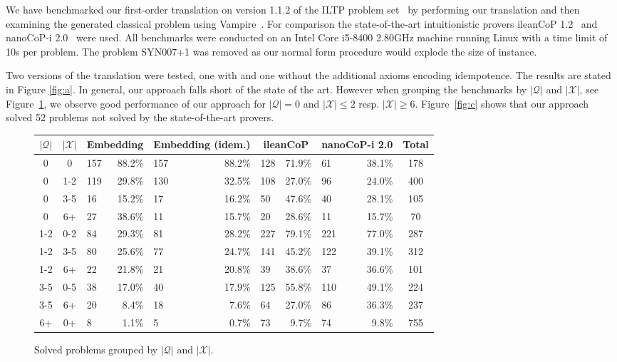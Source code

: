 \documentclass[runningheads]{llncs}
\begin{document}
We have benchmarked our first-order translation on version 1.1.2 of the ILTP problem set~\cite{iltp} by performing our translation and then examining the generated classical problem using Vampire~\cite{kovacs2013first}. 
For comparison the state-of-the-art intuitionistic provers ileanCoP 1.2~\cite{otten2008leancop} and nanoCoP-i 2.0~\cite{otten2021nanocop} were used. All benchmarks were conducted on an Intel Core i5-8400 2.80GHz machine running Linux with a time limit of 10s per problem. The problem \textsc{SYN007+1} was removed as our normal form procedure would explode the size of instance.

Two versions of the translation were tested, one with and one without the additional axioms encoding idempotence. The results are stated in Figure \ref{fig:a}. 
In general, our approach falls short of the state of the art. 
However when grouping the benchmarks by $|\mathcal Q|$ and $|\mathcal X|$, see Figure~\ref{fig:b},
we observe good performance of our approach for $|\mathcal Q| = 0$ and $|\mathcal X| \leq 2$ resp. $|\mathcal X| \geq 6$.
Figure~\ref{fig:c} shows that our approach solved 52 problems not solved by the state-of-the-art provers.\pagebreak
\begin{figure}
	\centering
	\begin{tabular}{c|c|lr|lr|lr|lr|c}
		$|\mathcal Q|$&$|\mathcal X|$&\multicolumn{2}{c}{Embedding}&\multicolumn{2}{c}{Embedding (idem.)}&\multicolumn{2}{c}{ileanCoP}&\multicolumn{2}{c}{nanoCoP-i 2.0}&Total\\\hline
		0&0		&157&88.2\%	&157&88.2\%		&128&71.9\%		&61&38.1\%	&178\\
		0&1-2	&119&29.8\%&130&32.5\%		&108&27.0\%		&96&24.0\%	&400\\
		0&3-5	&16&15.2\%	&17&16.2\%		&50&47.6\%		&40&28.1\%	&105\\
		0&6+	&27&38.6\%	&11&15.7\%		&20&28.6\%		&11&15.7\%	&70\\
		1-2&0-2	&84&29.3\%	&81&28.2\%		&227&79.1\%		&221&77.0\%	&287\\
		1-2&3-5	&80&25.6\%	&77&24.7\%		&141&45.2\%		&122&39.1\%	&312\\
		1-2&6+	&22&21.8\%	&21&20.8\%		&39&38.6\%		&37&36.6\%	&101\\
		3-5&0-5	&38&17.0\%	&40&17.9\%		&125&55.8\%		&110&49.1\%	&224\\
		3-5&6+  &20&8.4\%	&18&7.6\%		&64&27.0\%		&86&36.3\%	&237\\
		6+&0+	&8&1.1\%	&5&0.7\%		&73&9.7\%		&74&9.8\%	&755
	\end{tabular}
	\caption{Solved problems grouped by $|\mathcal Q|$ and $|\mathcal X|$.}
	\label{fig:b}
\end{figure}
\vspace*{-.5cm}
\end{document}
